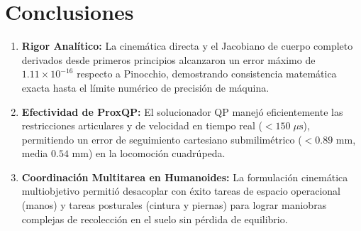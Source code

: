 \documentclass[11pt,a4paper]{article}
\begin{document}
\section{Conclusiones}
\begin{enumerate}
    \item \textbf{Rigor Analítico:} La cinemática directa y el Jacobiano de cuerpo completo derivados desde primeros principios alcanzaron un error máximo de $1.11 \times 10^{-16}$ respecto a Pinocchio, demostrando consistencia matemática exacta hasta el límite numérico de precisión de máquina.
    \item \textbf{Efectividad de ProxQP:} El solucionador QP manejó eficientemente las restricciones articulares y de velocidad en tiempo real ($< 150 \;\mu\text{s}$), permitiendo un error de seguimiento cartesiano submilimétrico ($< 0.89\text{ mm}$, media $0.54\text{ mm}$) en la locomoción cuadrúpeda.
    \item \textbf{Coordinación Multitarea en Humanoides:} La formulación cinemática multiobjetivo permitió desacoplar con éxito tareas de espacio operacional (manos) y tareas posturales (cintura y piernas) para lograr maniobras complejas de recolección en el suelo sin pérdida de equilibrio.
\end{enumerate}
\end{document}

